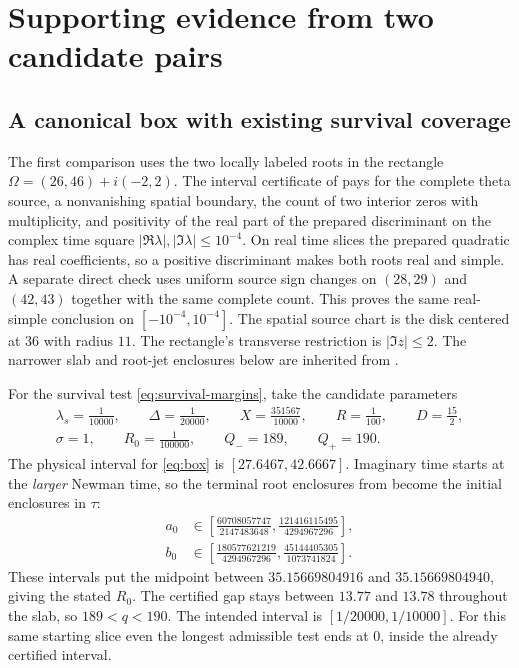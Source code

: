 \section{Supporting evidence from two candidate pairs}
\label{sec:evidence}

\subsection{A canonical box with existing survival coverage}

The first comparison uses the two locally labeled roots in the rectangle
\(\Omega=(26,46)+i(-2,2)\). The interval certificate of \cite{HDCWall}
pays for the complete theta source, a nonvanishing spatial boundary,
the count of two interior zeros with multiplicity, and positivity of
the real part of the prepared discriminant on the complex time square
\(\lvert\Re\lambda\rvert,\lvert\Im\lambda\rvert\le 10^{-4}\).
On real time slices the prepared quadratic has real coefficients, so
a positive discriminant makes both roots real and simple. A separate
direct check uses uniform source sign changes on \((28,29)\) and
\((42,43)\) together with the same complete count. This proves the same
real-simple conclusion on \([-10^{-4},10^{-4}]\). The spatial source chart is the disk centered
at \(36\) with radius \(11\). The rectangle's transverse restriction
is \(\lvert\Im z\rvert\le 2\). The narrower slab and root-jet enclosures
below are inherited from \cite{RTPilot}.

For the survival test \eqref{eq:survival-margins}, take the candidate
parameters
\begin{equation}
\begin{gathered}
 \lambda_s=\frac1{10000},\qquad \Delta=\frac1{20000},
 \qquad X=\frac{351567}{10000},\qquad R=\frac1{100},\qquad
 D=\frac{15}{2},\\
 \sigma=1,\qquad R_0=\frac1{100000},\qquad
 Q_-=189,\qquad Q_+=190 .
\end{gathered}
\label{eq:pilot-parameters}
\end{equation}
The physical interval for \eqref{eq:box} is
\([27.6467,42.6667]\). Imaginary time starts at the \emph{larger}
Newman time, so the terminal root enclosures from \cite{RTPilot} become
the initial enclosures in \(\tau\):
\begin{align*}
a_0&\in\left[\frac{60708057747}{2147483648},
                  \frac{121416115495}{4294967296}\right],\\
b_0&\in\left[\frac{180577621219}{4294967296},
                  \frac{45144405305}{1073741824}\right].
\end{align*}
These intervals put the midpoint between \(35.15669804916\) and
\(35.15669804940\), giving the stated \(R_0\). The certified gap stays
between \(13.77\) and \(13.78\) throughout the slab, so \(189<q<190\).
The intended interval is \([1/20000,1/10000]\). For this same starting
slice even the longest admissible test ends at \(0\), inside the
already certified interval.

